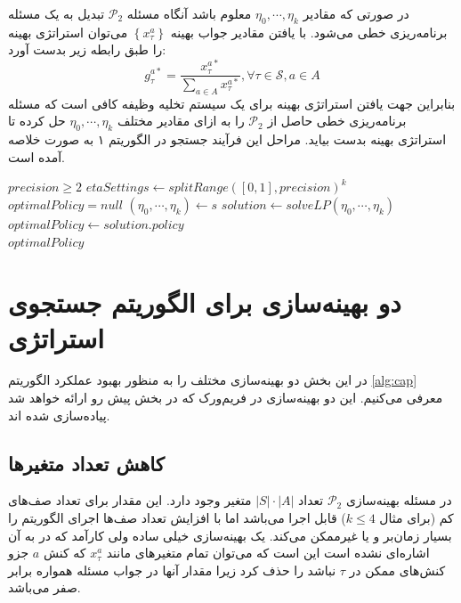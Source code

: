 در صورتی که مقادیر
$\eta_0, \cdots, \eta_k$
معلوم باشد آنگاه مسئله
$\mathcal{P}_2$
تبدیل به یک مسئله برنامه‌ریزی خطی می‌شود. با یافتن مقادیر جواب بهینه
$\left\{x_{\tau}^{a}\right\}$ 
می‌توان استراتژی بهینه را طبق رابطه زیر بدست آورد:
\begin{equation}
	g_{\tau}^{a *}=\frac{x_{\tau}^{a *}}{\sum_{a \in A} x_{\tau}^{a *}}, \forall \tau \in \mathcal{S}, a \in A
\end{equation}
بنابراین جهت یافتن استراتژی بهینه برای یک سیستم تخلیه وظیفه کافی است که مسئله برنامه‌ریزی خطی حاصل از
$\mathcal{P}_2$
را به ازای مقادیر مختلف 
$\eta_0, \cdots, \eta_k$
حل کرده تا استراتژی بهینه بدست بیاید. مراحل این فرآیند جستجو در الگوریتم ۱ به صورت خلاصه آمده است.

\begin{latin}
	\begin{algorithm}
		\begin{algorithmic}[1]
			\Require $precision \geq 2$
			\State $etaSettings \gets splitRange([0, 1], precision)^k$
			\State $optimalPolicy = null$
				\State $(\eta_0, \cdots, \eta_k) \gets s$
				\State $solution \gets solveLP(\eta_0, \cdots, \eta_k)$
					\State $optimalPolicy \gets solution.policy$
				\EndIf
			\EndFor \\
			\Return $optimalPolicy$
		\end{algorithmic}
	\end{algorithm}
\end{latin}

\section{دو بهینه‌سازی برای الگوریتم جستجوی استراتژی}
\label{sec:optim}
در این بخش دو بهینه‌سازی مختلف را به منظور بهبود عملکرد الگوریتم \ref{alg:cap} معرفی می‌کنیم. این دو بهینه‌سازی در فریم‌ورک  که در بخش پیش رو ارائه خواهد شد پیاده‌سازی شده اند.

\subsection{کاهش تعداد متغیرها}
\label{sub:reducevariable}
در مسئله بهینه‌سازی 
$\mathcal{P}_2$
تعداد 
$|S| \cdot |A|$
متغیر وجود دارد. این مقدار برای تعداد صف‌های کم (برای مثال $k \leq 4$) قابل اجرا می‌باشد اما با افزایش تعداد صف‌ها اجرای الگوریتم را بسیار زمان‌بر و یا غیرممکن می‌کند. یک بهینه‌سازی خیلی ساده ولی کارآمد که در \cite{Liu} به آن اشاره‌ای نشده است این است که می‌توان تمام متغیرهای مانند
$x_{\tau}^{a}$
که کنش
$a$
جزو کنش‌های ممکن در
$\tau$
نباشد را حذف کرد زیرا مقدار آنها در جواب مسئله همواره برابر صفر می‌باشد.

